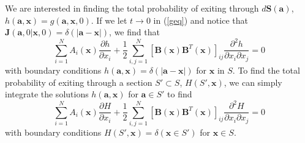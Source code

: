\documentclass{article}
\newcommand{\mb}{\mathbf}
\begin{document}
We are interested in finding the total probability of exiting through $d{\mb S}({\mb a})$, $h({\mb a},{\mb x})=g({\mb a},{\mb x},0)$.  If we let $t\to 0$ in (\ref{geq}) and notice that ${\mb J}({\mb a},0|{\mb x},0)=\delta(|{\mb a}-{\mb x}|)$, we find that 
\begin{equation*}
\sum_{i=1}^NA_i({\mb x})\frac{\partial h}{\partial x_i}+\frac{1}{2}\sum_{i,j=1}^N[{\mb B}({\mb x}){\mb B}^T({\mb x})]_{ij}\frac{\partial ^2 h}{\partial x_i\partial x_j}=0
\end{equation*}
with boundary conditions $h({\mb a},{\mb x})=\delta(|{\mb a}-{\mb x}|)$ for ${\mb x}$ in $S$. To find the total probability of exiting through a section $S'\subset S$, $H(S',{\mb x})$, we can simply integrate the solutions $h({\mb a},{\mb x})$ for ${\mb a}\in S'$ to find 
\begin{equation}
\sum_{i=1}^NA_i({\mb x})\frac{\partial H}{\partial x_i}+\frac{1}{2}\sum_{i,j=1}^N[{\mb B}({\mb x}){\mb B}^T({\mb x})]_{ij}\frac{\partial ^2 H}{\partial x_i\partial x_j}=0 \label{ER}
\end{equation}
with boundary conditions $H(S',{\mb x})=\delta({\mb x}\in S')$ for ${\mb x}\in S$.



%
\end{document}
